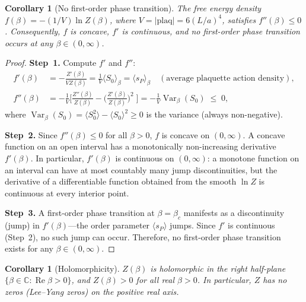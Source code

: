 \documentclass[12pt,a4paper]{article}
\theoremstyle{plain}
\newtheorem{corollary}[theorem]{Corollary}
\theoremstyle{definition}
\theoremstyle{remark}
\begin{document}
\begin{corollary}[No first-order phase transition]\label{cor:no1st}
The free energy density $f(\beta)=-(1/V)\ln Z(\beta)$, where $V=|\mathrm{plaq}|=6(L/a)^4$, satisfies $f''(\beta)\leq 0$. Consequently, $f$ is concave, $f'$ is continuous, and no first-order phase transition occurs at any $\beta\in(0,\infty)$.
\end{corollary}

\begin{proof}
\textbf{Step~1.} Compute $f'$ and $f''$:
\begin{align}
f'(\beta) &= -\frac{Z'(\beta)}{VZ(\beta)} = \frac{1}{V}\langle S_0\rangle_\beta = \langle s_P\rangle_\beta \quad(\text{average plaquette action density}),\label{eq:fprime}\\
f''(\beta) &= -\frac{1}{V}\bigg[\frac{Z''(\beta)}{Z(\beta)}-\bigg(\frac{Z'(\beta)}{Z(\beta)}\bigg)^{\!2}\;\bigg] = -\frac{1}{V}\operatorname{Var}_\beta(S_0) \;\leq\; 0,\label{eq:fdprime}
\end{align}
where $\operatorname{Var}_\beta(S_0)=\langle S_0^2\rangle-\langle S_0\rangle^2\geq 0$ is the variance (always non-negative).

\textbf{Step~2.} Since $f''(\beta)\leq 0$ for all $\beta>0$, $f$ is concave on $(0,\infty)$. A concave function on an open interval has a monotonically non-increasing derivative $f'(\beta)$. In particular, $f'(\beta)$ is continuous on $(0,\infty)$: a monotone function on an interval can have at most countably many jump discontinuities, but the derivative of a differentiable function obtained from the smooth $\ln Z$ is continuous at every interior point.

\textbf{Step~3.} A first-order phase transition at $\beta=\beta_c$ manifests as a discontinuity (jump) in $f'(\beta)$---the order parameter $\langle s_P\rangle$ jumps. Since $f'$ is continuous (Step~2), no such jump can occur. Therefore, no first-order phase transition exists for any $\beta\in(0,\infty)$.
\end{proof}

\begin{corollary}[Holomorphicity]\label{cor:holo}
$Z(\beta)$ is holomorphic in the right half-plane $\{\beta\in\mathbb{C}:\operatorname{Re}\beta>0\}$, and $Z(\beta)>0$ for all real $\beta>0$. In particular, $Z$ has no zeros (Lee--Yang zeros) on the positive real axis.
\end{corollary}
\end{document}

